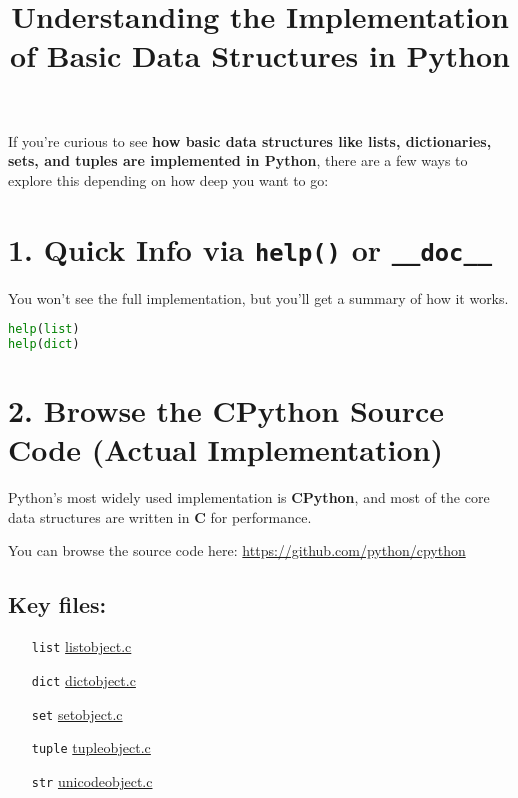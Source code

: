 \documentclass{article}
\title{Understanding the Implementation of Basic Data Structures in Python}
\begin{document}
\maketitle

If you're curious to see \textbf{how basic data structures like lists, dictionaries, sets, and tuples are implemented in Python}, there are a few ways to explore this depending on how deep you want to go:

\section*{1. Quick Info via \texttt{help()} or \texttt{\_\_doc\_\_}}
You won’t see the full implementation, but you’ll get a summary of how it works.

\begin{lstlisting}[language=Python]
help(list)
help(dict)
\end{lstlisting}

\section*{2. Browse the CPython Source Code (Actual Implementation)}

Python’s most widely used implementation is \textbf{CPython}, and most of the core data structures are written in \textbf{C} for performance.

You can browse the source code here: \url{https://github.com/python/cpython}

\subsection*{Key files:}

\begin{itemize}[leftmargin=2cm]
  \item[\texttt{list}] \href{https://github.com/python/cpython/blob/main/Objects/listobject.c}{listobject.c}
  \item[\texttt{dict}] \href{https://github.com/python/cpython/blob/main/Objects/dictobject.c}{dictobject.c}
  \item[\texttt{set}] \href{https://github.com/python/cpython/blob/main/Objects/setobject.c}{setobject.c}
  \item[\texttt{tuple}] \href{https://github.com/python/cpython/blob/main/Objects/tupleobject.c}{tupleobject.c}
  \item[\texttt{str}] \href{https://github.com/python/cpython/blob/main/Objects/unicodeobject.c}{unicodeobject.c}
\end{itemize}
\end{document}

